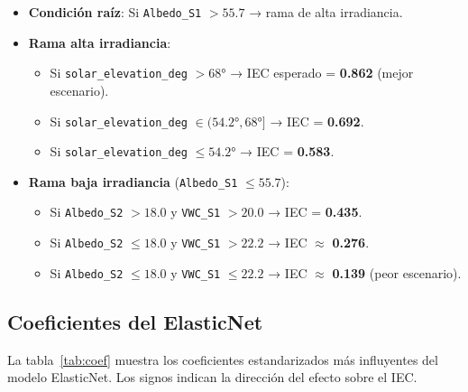 \documentclass[12pt,a4paper]{article}
\begin{document}
\begin{itemize}
    \item \textbf{Condición raíz}: Si \texttt{Albedo\_S1} $> 55.7$ → rama de alta irradiancia.
    \item \textbf{Rama alta irradiancia}:
    \begin{itemize}[noitemsep]
        \item Si \texttt{solar\_elevation\_deg} $> 68°$ → IEC esperado = \textbf{0.862}
            (mejor escenario).
        \item Si \texttt{solar\_elevation\_deg} $\in (54.2°, 68°]$ → IEC = \textbf{0.692}.
        \item Si \texttt{solar\_elevation\_deg} $\leq 54.2°$ → IEC = \textbf{0.583}.
    \end{itemize}
    \item \textbf{Rama baja irradiancia} (\texttt{Albedo\_S1} $\leq 55.7$):
    \begin{itemize}[noitemsep]
        \item Si \texttt{Albedo\_S2} $> 18.0$ y \texttt{VWC\_S1} $> 20.0$ → IEC = \textbf{0.435}.
        \item Si \texttt{Albedo\_S2} $\leq 18.0$ y \texttt{VWC\_S1} $> 22.2$ → IEC $\approx$ \textbf{0.276}.
        \item Si \texttt{Albedo\_S2} $\leq 18.0$ y \texttt{VWC\_S1} $\leq 22.2$ → IEC $\approx$ \textbf{0.139}
            (peor escenario).
    \end{itemize}
\end{itemize}

\subsection{Coeficientes del ElasticNet}

La tabla~\ref{tab:coef} muestra los coeficientes estandarizados más influyentes del
modelo ElasticNet. Los signos indican la dirección del efecto sobre el IEC.
\end{document}
